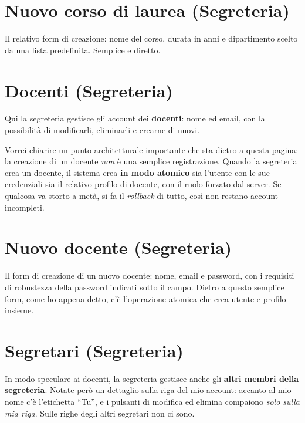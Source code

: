 \documentclass[11pt]{article}
\begin{document}
\section*{Nuovo corso di laurea (Segreteria)}

Il relativo form di creazione: nome del corso, durata in anni e dipartimento scelto da
una lista predefinita. Semplice e diretto.

\section*{Docenti (Segreteria)}

Qui la segreteria gestisce gli account dei \textbf{docenti}: nome ed email, con la
possibilità di modificarli, eliminarli e crearne di nuovi.

Vorrei chiarire un punto architetturale importante che sta dietro a questa pagina: la
creazione di un docente \emph{non} è una semplice registrazione. Quando la segreteria
crea un docente, il sistema crea \textbf{in modo atomico} sia l'utente con le sue
credenziali sia il relativo profilo di docente, con il ruolo forzato dal server. Se
qualcosa va storto a metà, si fa il \emph{rollback} di tutto, così non restano account
incompleti.

\section*{Nuovo docente (Segreteria)}

Il form di creazione di un nuovo docente: nome, email e password, con i requisiti di
robustezza della password indicati sotto il campo. Dietro a questo semplice form, come
ho appena detto, c'è l'operazione atomica che crea utente e profilo insieme.

\section*{Segretari (Segreteria)}

In modo speculare ai docenti, la segreteria gestisce anche gli \textbf{altri membri della
segreteria}. Notate però un dettaglio sulla riga del mio account: accanto al mio nome
c'è l'etichetta ``Tu'', e i pulsanti di modifica ed elimina compaiono \emph{solo sulla
mia riga}. Sulle righe degli altri segretari non ci sono.
\end{document}
